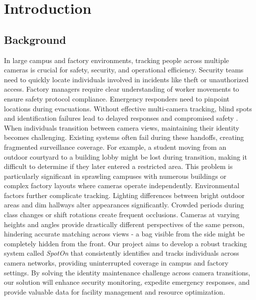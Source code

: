 \newcommand{\persona}[4]{%
    \textbf{#1}
    \small\begin{tabular}[t]{|p{.8in} | p{1.5in}|}
        \hline
        \textbf{Preferences} & #2 \\\hline
        \textbf{Pain Points} & #3 \\\hline
        \textbf{Goals} & #4 \\
        \hline
    \end{tabular}
    \vspace{4pt}
}


\chapter{Introduction}
\label{chap:introduction}

\section{Background}
\label{section:background}

In large campus and factory environments, tracking people across multiple cameras is crucial for safety, security, and operational efficiency. Security teams need to quickly locate individuals involved in incidents like theft or unauthorized access. Factory managers require clear understanding of worker movements to ensure safety protocol compliance. Emergency responders need to pinpoint locations during evacuations. Without effective multi-camera tracking, blind spots and identification failures lead to delayed responses and compromised safety \cite{wangetal:2021}.
When individuals transition between camera views, maintaining their identity becomes challenging. Existing systems often fail during these handoffs, creating fragmented surveillance coverage. For example, a student moving from an outdoor courtyard to a building lobby might be lost during transition, making it difficult to determine if they later entered a restricted area. This problem is particularly significant in sprawling campuses with numerous buildings or complex factory layouts where cameras operate independently.
Environmental factors further complicate tracking. Lighting differences between bright outdoor areas and dim hallways alter appearances significantly. Crowded periods during class changes or shift rotations create frequent occlusions. Cameras at varying heights and angles provide drastically different perspectives of the same person, hindering accurate matching across views - a bag visible from the side might be completely hidden from the front.
Our project aims to develop a robust tracking system called \textit{SpotOn} that consistently identifies and tracks individuals across camera networks, providing uninterrupted coverage in campus and factory settings. By solving the identity maintenance challenge across camera transitions, our solution will enhance security monitoring, expedite emergency responses, and provide valuable data for facility management and resource optimization.

